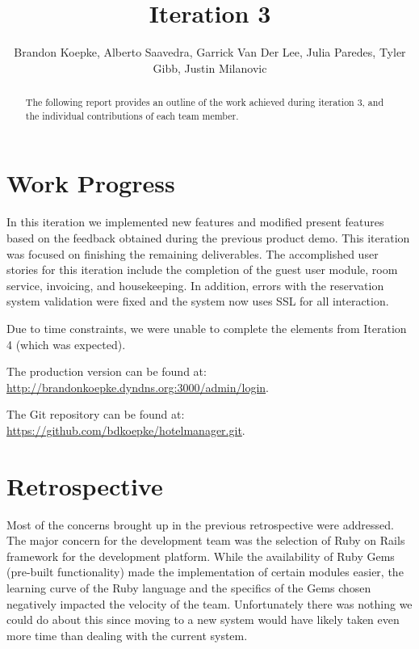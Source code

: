 \documentclass[12pt]{elsarticle}
\begin{document}
\begin{frontmatter}
  \title{Iteration 3}
  \author{Brandon Koepke, Alberto Saavedra, Garrick Van Der Lee, Julia Paredes, Tyler Gibb, Justin Milanovic}
	\begin{abstract}
		The following report provides an outline of the work achieved during iteration 3, and the individual contributions of each team member.
	\end{abstract}
\end{frontmatter}
\tableofcontents
\listoffigures
\clearpage

\section{Work Progress}

In this iteration we implemented new features and modified present features based on the feedback obtained during the previous product demo. This iteration was focused on finishing the remaining deliverables. The accomplished user stories for this iteration include the completion of the guest user module, room service, invoicing, and housekeeping. In addition, errors with the reservation system validation were fixed and the system now uses SSL for all interaction.

Due to time constraints, we were unable to complete the elements from Iteration 4 (which was expected).

The production version can be found at: \url{http://brandonkoepke.dyndns.org:3000/admin/login}.

The Git repository can be found at: \href{https://github.com/bdkoepke/hotelmanager.git}{https://github.com/bdkoepke/hotelmanager.git}.

\section{Retrospective}

Most of the concerns brought up in the previous retrospective were addressed. The major concern for the development team was the selection of Ruby on Rails framework for the development platform. While the availability of Ruby Gems (pre-built functionality) made the implementation of certain modules easier, the learning curve of the Ruby language and the specifics of the Gems chosen negatively impacted the velocity of the team. Unfortunately there was nothing we could do about this since moving to a new system would have likely taken even more time than dealing with the current system.
\end{document}
